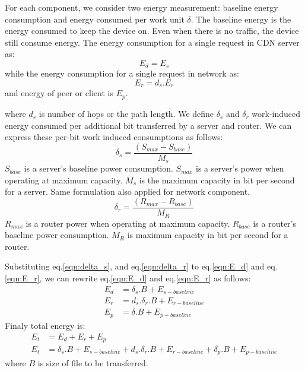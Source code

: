 For each component, we consider two energy measurement:  baseline energy consumption and energy consumed per work unit $\delta$.
The baseline energy is the energy consumed to keep the device on.
Even when there is no traffic, the device still consume energy.
The energy consumption for a single request in CDN server as:
\begin{equation}\label{eqn:E_d}
	E_{d} = E_s
\end{equation}
while the energy consumption for a single request in network as:
\begin{equation}\label{eqn:E_r}
	E_{r} = d_s.E_r
\end{equation}
and energy of peer or client is $E_p$.

where $d_s$ is number of hops or the path length.
We define $\delta_s$ and $\delta_r$ work-induced energy consumed per additional bit transferred by a server and router.   
We can express these per-bit work induced consumptions as follows:
\begin{equation}\label{eqn:delta_s}
	\delta_s = \frac{(S_{max} - S_{base})}{M_s} 
\end{equation}
$S_{base}$ is a server's baseline power consumption.  
$S_{max}$ is a server's power when operating at maximum capacity.
$M_s$ is the maximum capacity in bit per second for a server.
Same formulation also applied for network component.  
\begin{equation}\label{eqn:delta_r}
	\delta_r = \frac{(R_{max} - R_{base})}{M_R} 
\end{equation}
$R_{max}$ is a router power when operating at maximum capacity.
$R_{base}$ is a router's baseline power consumption.
$M_R$ is maximum capacity in bit per second for a router.

Substituting eq.\ref{eqn:delta_s}, and eq.\ref{eqn:delta_r} to eq.\ref{eqn:E_d} and eq.\ref{eqn:E_r}, we can rewrite eq.\ref{eqn:E_d} and eq.\ref{eqn:E_r} as follows:
\begin{equation}\label{eqn:E_ddanE_r}
\begin{split}
	E_{d} &= \delta_s.B + E_{s-baseline}\\
	E_{r} &= d_s.\delta_r.B + E_{r-baseline}\\
	E_{p} &= \delta.B + E_{p-baseline}
\end{split}
\end{equation}
Finaly total energy is:
\begin{equation}\label{eqn:E_t}
\begin{split}
	E_{t} &= E_d + E_r + E_p \\
	E_{t} &= \delta_s.B + E_{s-baseline} + d_s.\delta_r.B + E_{r-baseline} + \delta_p.B + E_{p-baseline}
\end{split}
\end{equation}
where $B$ is size of file to be transferred. 

